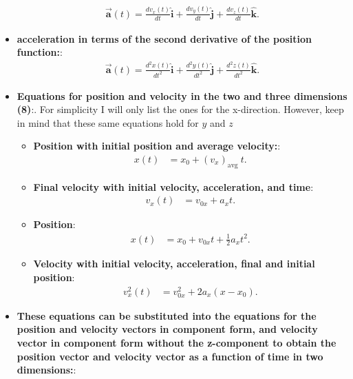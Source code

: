 \documentclass{report}
\begin{document}
\begin{itemize}
            \begin{align*}
                \vec{\mathbf{a}}(t) = \frac{dv_{x}(t)}{dt}\hat{\mathbf{i}} + \frac{dv_{y}(t)}{dt}\hat{\mathbf{j}} + \frac{dv_{z}(t)}{dt}\hat{\mathbf{k}}
            .\end{align*}
        \item \textbf{acceleration in terms of the second derivative of the position function:}:
            \begin{align*}
                \vec{\mathbf{a}}(t) = \frac{d^{2}x(t)}{dt^{2}}\hat{\mathbf{i}} + \frac{d^{2}y(t)}{dt^{2}}\hat{\mathbf{j}} + \frac{d^{2}z(t)}{dt^{2}}\hat{\mathbf{k}}
            .\end{align*}
        \item \textbf{Equations for position and velocity in the two and three dimensions (8)}:. For simplicity I will only list the ones for the x-direction. However, keep in mind that these same equations hold for $y$ and $z$
            \begin{itemize}
                \item \textbf{Position with initial position and average velocity:}: 
                    \begin{align*}
                        x(t)&=x_0+\left(v_x\right)_{\text {avg }} t
                    .\end{align*}
                \item \textbf{Final velocity with initial velocity, acceleration, and time}:
                    \begin{align*}
                        v_x(t)&=v_{0 x}+a_x t
                    .\end{align*}
                \item \textbf{Position}:
                    \begin{align*}
                        x(t)&=x_0+v_{0 x} t+\frac{1}{2} a_x t^2
                    .\end{align*}
                \item \textbf{Velocity with initial velocity, acceleration, final and initial position}:
                    \begin{align*}
                        v_x^2(t)&=v_{0 x}^2+2 a_x\left(x-x_0\right) 
                    .\end{align*}
            \end{itemize}
        \item \textbf{These equations can be substituted into the equations for the position and velocity vectors in component form, and velocity vector in component form without the z-component to obtain the position vector and velocity vector as a function of time in two dimensions:}:

\end{itemize}
\end{document}

